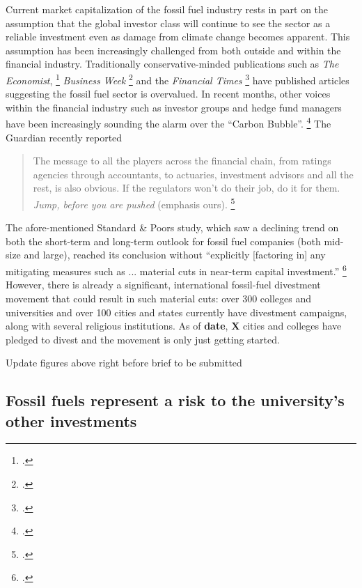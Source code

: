 Current market capitalization of the fossil fuel industry rests in part on the assumption that the global investor class will continue to see the sector as a reliable investment even as damage from climate change becomes apparent. 
This assumption has been increasingly challenged from both outside and within the financial industry. 
Traditionally conservative-minded publications such as \emph{The Economist}, \footcite{EconomistUnburnable} \emph{Business Week} \footcite{BusinessWeekOvervalued} and the \emph{Financial Times} \footcite{FTOvervalued} have published articles suggesting the fossil fuel sector is overvalued. 
In recent months, other voices within the financial industry such as investor groups and hedge fund managers have been increasingly sounding the alarm over the ``Carbon Bubble''. \footcite{JeremyGrantham} 
The Guardian recently reported
\begin{quote}
The message to all the players across the financial chain, from ratings agencies through accountants, to actuaries, investment advisors and all the rest, is also obvious. If the regulators won't do their job, do it for them. \emph{Jump, before you are pushed} (emphasis ours). \footcite{Guardian6Trillion}
\end{quote}
The afore-mentioned Standard \& Poors study, which saw a declining trend on both the short-term and long-term outlook for fossil fuel companies (both mid-size and large), reached its conclusion without ``explicitly [factoring in] any mitigating measures such as ... material cuts in near-term capital investment.'' \footcite{SandPConstrained}
However, there is already a significant, international fossil-fuel divestment movement that could result in such material cuts: over 300 colleges and universities and over 100 cities and states currently have divestment campaigns, along with several religious institutions.
As of \textbf{date}, \textbf{X} cities and \textbf{} colleges have pledged to divest and the movement is only just getting started.



\begin{vcom}
Update figures above right before brief to be submitted
\end{vcom}



	\subsection {Fossil fuels represent a risk to the university's other investments}



